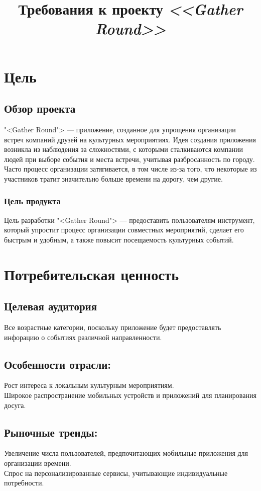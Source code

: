 \documentclass[a4paper,12pt]{extarticle}
\title{Требования к проекту \textit{<<Gather Round>>}}
\date{}
\begin{document}
\newpage
\setcounter{page}{1}
{
  \hypersetup{linkcolor=black}
}

\maketitle


\section{Цель}
\subsection{Обзор проекта} 
\noindent
"<Gather Round"> — приложение, созданное для упрощения организации встреч компаний друзей на культурных мероприятиях. 
Идея создания приложения возникла из наблюдения за сложностями, с которыми сталкиваются компании людей при выборе события и места встречи, учитывая разбросанность по городу. 
Часто процесс организации затягивается, в том числе из-за того, что некоторые из участников тратит значительно больше времени на дорогу, чем другие.
\subsubsection{Цель продукта} 
\noindent
Цель разработки "<Gather Round"> — предоставить пользователям инструмент, который упростит процесс организации совместных мероприятий, сделает его быстрым и удобным, а также повысит посещаемость культурных событий.

\section{Потребительская ценность}
\subsection{Целевая аудитория} 
\noindent
Все возрастные категории, поскольку приложение будет предоставлять инфорацию о событиях различной направленности.
\subsection{Особенности отрасли:}
\noindent
Рост интереса к локальным культурным мероприятиям.
\\
Широкое распространение мобильных устройств и приложений для планирования досуга.

\subsection{Рыночные тренды:}
\noindent
Увеличение числа пользователей, предпочитающих мобильные приложения для организации времени.
\\
Спрос на персонализированные сервисы, учитывающие индивидуальные потребности.
\end{document}
